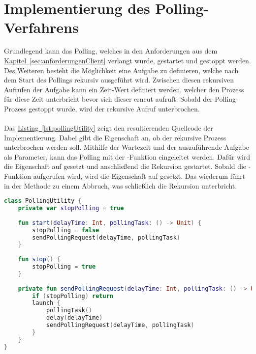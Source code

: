 \section{Implementierung des Polling-Verfahrens}\label{sec:polling}
Grundlegend kann das Polling, welches in den Anforderungen aus dem \hyperref[sec:anforderungenClient]{Kapitel~\ref{sec:anforderungenClient}} verlangt wurde, gestartet und gestoppt werden. Des Weiteren besteht die Möglichkeit eine Aufgabe zu definieren, welche nach dem Start des Pollings rekursiv ausgeführt wird. Zwischen diesen rekursiven Aufrufen der Aufgabe kann ein Zeit-Wert definiert werden, welcher den Prozess für diese Zeit unterbricht bevor sich dieser erneut aufruft. Sobald der Polling-Prozess gestoppt wurde, wird der rekursive Aufruf unterbrochen.\\
\\
Das \hyperref[lst:pollingUtility]{Listing~\ref{lst:pollingUtility}} zeigt den resultierenden Quellcode der Implementierung. Dabei gibt die Eigenschaft  an, ob der rekursive Prozess unterbrochen werden soll. Mithilfe der Wartezeit und der auszuführende Aufgabe als Parameter, kann das Polling mit der -Funktion eingeleitet werden. Dafür wird die Eigenschaft  auf  gesetzt und anschließend die Rekursion gestartet. Sobald die -Funktion aufgerufen wird, wird die Eigenschaft  auf  gesetzt. Das wiederum führt in der Methode  zu einem Abbruch, was schließlich die Rekursion unterbricht.\\
\begin{lstlisting}[style=lstStyleFramed, language=Kotlin, caption={Implementierung der Klasse \code{PollingUtility} für die Umsetzung des Polling-Verfahrens}, label=lst:pollingUtility, float]
class PollingUtility {
	private var stopPolling = true
	
	fun start(delayTime: Int, pollingTask: () -> Unit) {
		stopPolling = false
		sendPollingRequest(delayTime, pollingTask)
	}
	
	fun stop() {
		stopPolling = true
	}
	
	private fun sendPollingRequest(delayTime: Int, pollingTask: () -> Unit) {
		if (stopPolling) return
		launch {
			pollingTask()
			delay(delayTime)
			sendPollingRequest(delayTime, pollingTask)
		}
	}
}
\end{lstlisting}
\\
